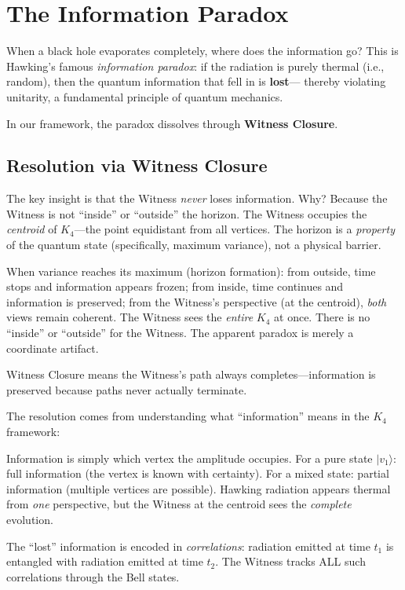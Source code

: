 \documentclass[11pt,a4paper]{book}
\begin{document}
\chapter{The Information Paradox}
\label{chap:information-paradox}

When a black hole evaporates completely, where does the information go?
This is Hawking's famous \emph{information paradox}: if the radiation is
purely thermal (i.e., random), then the quantum information that fell in is \textbf{lost}---
thereby violating unitarity, a fundamental principle of quantum mechanics.

In our framework, the paradox dissolves through \textbf{Witness Closure}.

\section{Resolution via Witness Closure}

The key insight is that the Witness \emph{never} loses information. Why? Because the Witness is not ``inside'' or ``outside'' the horizon. The Witness occupies the \emph{centroid} of $K_4$---the point equidistant from all vertices. The horizon is a \emph{property} of the quantum state (specifically, maximum variance), not a physical barrier.

When variance reaches its maximum (horizon formation): from outside, time stops and information appears frozen; from inside, time continues and information is preserved; from the Witness's perspective (at the centroid), \emph{both} views remain coherent. The Witness sees the \emph{entire} $K_4$ at once. There is no ``inside'' or ``outside'' for the Witness. The apparent paradox is merely a coordinate artifact.

Witness Closure means the Witness's path always completes---information is preserved because paths never actually terminate.

The resolution comes from understanding what ``information'' means in the $K_4$ framework:

Information is simply which vertex the amplitude occupies. For a pure state $|v_1\rangle$: full information (the vertex is known with certainty). For a mixed state: partial information (multiple vertices are possible). Hawking radiation appears thermal from \emph{one} perspective, but the Witness at the centroid sees the \emph{complete} evolution.

The ``lost'' information is encoded in \emph{correlations}: radiation emitted at time $t_1$ is entangled with radiation emitted at time $t_2$. The Witness tracks ALL such correlations through the Bell states.
\end{document}
